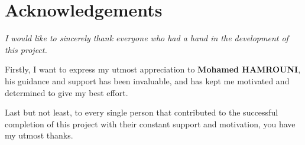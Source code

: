 \chapter*{\huge Acknowledgements}

\begin{center}
    \it \LARGE
    I would like to sincerely thank everyone who had a hand in the development of this project.

    Firstly, I want to express my utmost appreciation to \textbf{Mohamed HAMROUNI}, his guidance and support has been invaluable, and has kept me motivated and determined to give my best effort.

    Last but not least, to every single person that contributed to the successful completion of this project with their constant support and motivation, you have my utmost thanks.
\end{center}